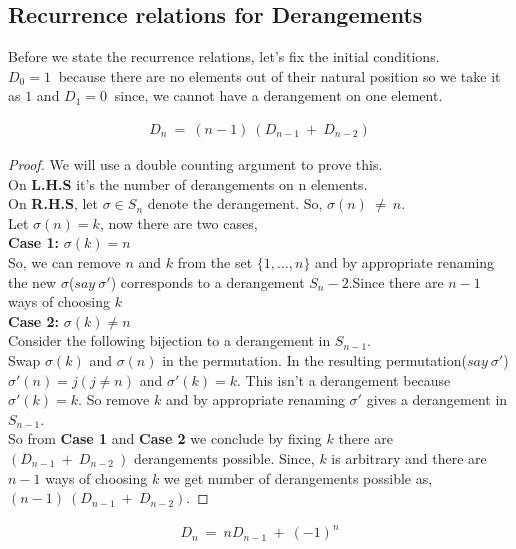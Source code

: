 \subsection{Recurrence relations for Derangements}
Before we state the recurrence relations, let's fix the initial conditions. \\
$D_0 = 1~$ because there are no elements out of their natural position so we take it as $1$  and $D_1=0~$ since, we cannot have a derangement on one element.
\begin{recurrence relation} \label{rel:1}
\begin{align}
    D_n ~=~ (n-1)~(D_{n-1}~+~D_{n-2})
\end{align}
\end{recurrence relation}
\begin{proof}
We will use a double counting argument to prove this.\\
On \textbf{L.H.S} it's the number of derangements on n elements. \\
On \textbf{R.H.S}, let $\sigma\in S_n$ denote the derangement. So, $\sigma(n)~\neq~n$.\\
Let $\sigma(n)=k$, now there are two cases, \\
\textbf{Case 1:} $\sigma(k)=n$ \\
So, we can remove  $n$ and $k$ from the set $\{1,...,n\}$ and by appropriate renaming the new $\sigma$($say~ \sigma'$) corresponds to a derangement $S_n-2$.Since there are $n-1$ ways of choosing $k$\\
\textbf{Case 2:} $\sigma(k)\neq n$ \\
Consider the following bijection to a derangement in $S_{n-1}$.\\
Swap $\sigma(k)$ and $\sigma(n)$ in the permutation. In the resulting permutation($say~ \sigma'$) $\sigma'(n)=j (j \neq n)$ and $\sigma'(k)=k$. This isn't a derangement because $\sigma'(k)=k$. So remove $k$ and by appropriate renaming $\sigma'$ gives a derangement in $S_{n-1}$. \\
So from \textbf{Case 1} and \textbf{Case 2} we conclude by fixing $k$ there are $(D_{n-1}~+~D_{n-2}~)$ derangements possible. Since, $k$ is arbitrary and there are $n-1$ ways of choosing $k$ we get number of derangements possible as,   $(n-1)~(D_{n-1}~+~D_{n-2})$.
\end{proof}
\begin{recurrence relation} \label{rel:2}
\begin{align}
    D_n ~=~ nD_{n-1}~+~(-1)^n  
\end{align}
\end{recurrence relation}
